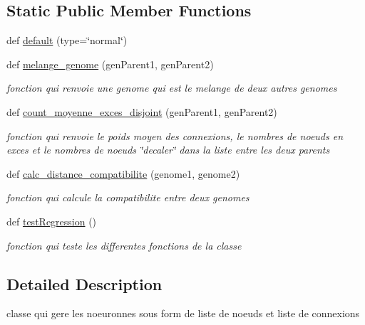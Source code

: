 \subsection*{Static Public Member Functions}
\begin{DoxyCompactItemize}
\item 
def \hyperlink{classsrc_1_1genome_1_1_genome_aae09cdbac38ace26aca0617b2f2c4d26}{default} (type=\char`\"{}normal\char`\"{})
\item 
def \hyperlink{classsrc_1_1genome_1_1_genome_abf21abdd78ee72ce6b6ecf4cc698c435}{melange\+\_\+genome} (gen\+Parent1, gen\+Parent2)
\begin{DoxyCompactList}\small\item\em fonction qui renvoie une genome qui est le melange de deux autres genomes \end{DoxyCompactList}\item 
def \hyperlink{classsrc_1_1genome_1_1_genome_aa5ef9dec09b2a88c68a7bd2f92dce8b1}{count\+\_\+moyenne\+\_\+exces\+\_\+disjoint} (gen\+Parent1, gen\+Parent2)
\begin{DoxyCompactList}\small\item\em fonction qui renvoie le poids moyen des connexions, le nombres de noeuds en exces et le nombres de noeuds \char`\"{}decaler\char`\"{} dans la liste entre les deux parents \end{DoxyCompactList}\item 
def \hyperlink{classsrc_1_1genome_1_1_genome_a09f8ee3a23f65a11fe27d77f24c7add1}{calc\+\_\+distance\+\_\+compatibilite} (genome1, genome2)
\begin{DoxyCompactList}\small\item\em fonction qui calcule la compatibilite entre deux genomes \end{DoxyCompactList}\item 
def \hyperlink{classsrc_1_1genome_1_1_genome_aa6a19674e0dd3cf702f66e9ef20914ee}{test\+Regression} ()
\begin{DoxyCompactList}\small\item\em fonction qui teste les differentes fonctions de la classe \end{DoxyCompactList}\end{DoxyCompactItemize}


\subsection{Detailed Description}
classe qui gere les noeuronnes sous form de liste de noeuds et liste de connexions 

